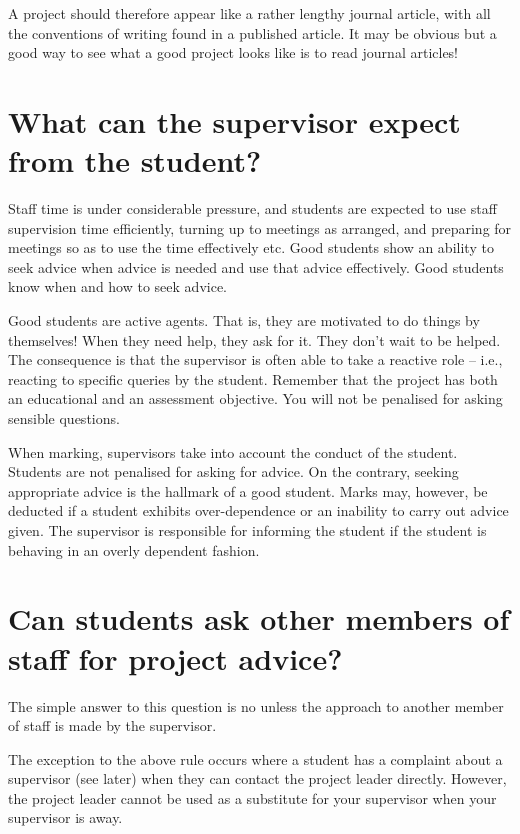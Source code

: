 \documentclass[
]{book}
\begin{document}
A project should therefore appear like a rather lengthy journal article, with all the conventions of writing found in a published article. It may be obvious but a good way to see what a good project looks like is to read journal articles!

\section{What can the supervisor expect from the student?}\label{what-can-the-supervisor-expect-from-the-student}

Staff time is under considerable pressure, and students are expected to use staff supervision time efficiently, turning up to meetings as arranged, and preparing for meetings so as to use the time effectively etc. Good students show an ability to seek advice when advice is needed and use that advice effectively. Good students know when and how to seek advice.

Good students are active agents. That is, they are motivated to do things by themselves! When they need help, they ask for it. They don't wait to be helped. The consequence is that the supervisor is often able to take a reactive role -- i.e., reacting to specific queries by the student. Remember that the project has both an educational and an assessment objective. You will not be penalised for asking sensible questions.

When marking, supervisors take into account the conduct of the student. Students are not penalised for asking for advice. On the contrary, seeking appropriate advice is the hallmark of a good student. Marks may, however, be deducted if a student exhibits over-dependence or an inability to carry out advice given. The supervisor is responsible for informing the student if the student is behaving in an overly dependent fashion.

\section{Can students ask other members of staff for project advice?}\label{can-students-ask-other-members-of-staff-for-project-advice}

The simple answer to this question is no unless the approach to another member of staff is made by the supervisor.

The exception to the above rule occurs where a student has a complaint about a supervisor (see later) when they can contact the project leader directly. However, the project leader cannot be used as a substitute for your supervisor when your supervisor is away.
\end{document}
